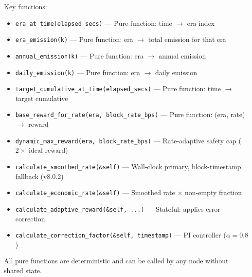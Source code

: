 \documentclass[11pt,a4paper]{article}
\begin{document}
Key functions:
\begin{itemize}
    \item \texttt{era\_at\_time(elapsed\_secs)} --- Pure function: time $\to$ era index
    \item \texttt{era\_emission(k)} --- Pure function: era $\to$ total emission for that era
    \item \texttt{annual\_emission(k)} --- Pure function: era $\to$ annual emission
    \item \texttt{daily\_emission(k)} --- Pure function: era $\to$ daily emission
    \item \texttt{target\_cumulative\_at\_time(elapsed\_secs)} --- Pure function: time $\to$ target cumulative
    \item \texttt{base\_reward\_for\_rate(era, block\_rate\_bps)} --- Pure function: (era, rate) $\to$ reward
    \item \texttt{dynamic\_max\_reward(era, block\_rate\_bps)} --- Rate-adaptive safety cap ($2\times$ ideal reward)
    \item \texttt{calculate\_smoothed\_rate(\&self)} --- Wall-clock primary, block-timestamp fallback (v8.0.2)
    \item \texttt{calculate\_economic\_rate(\&self)} --- Smoothed rate $\times$ non-empty fraction
    \item \texttt{calculate\_adaptive\_reward(\&self, ...)} --- Stateful: applies error correction
    \item \texttt{calculate\_correction\_factor(\&self, timestamp)} --- PI controller ($\alpha = 0.8$)
\end{itemize}

All pure functions are deterministic and can be called by any node without shared state.
\end{document}
